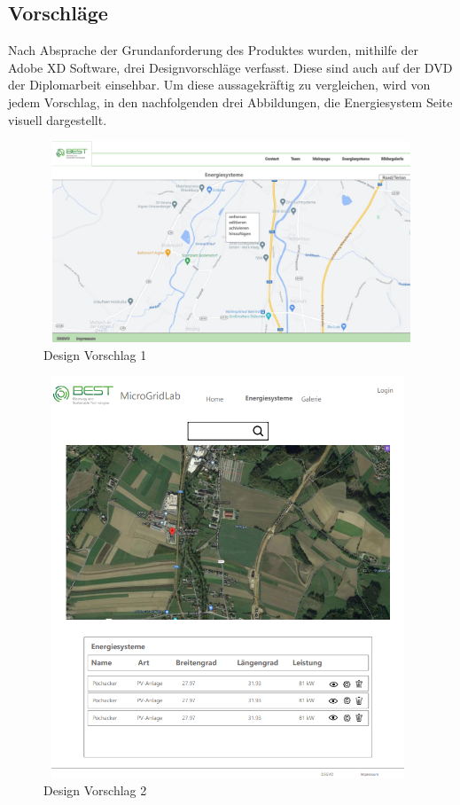 \subsection{Vorschläge}
Nach Absprache der Grundanforderung des Produktes wurden, mithilfe der Adobe XD Software,  drei Designvorschläge verfasst. Diese sind auch auf der DVD der Diplomarbeit einsehbar. Um diese aussagekräftig zu vergleichen, wird von jedem Vorschlag, in den nachfolgenden drei Abbildungen, die Energiesystem Seite visuell dargestellt.
\begin{figure}[h]
	\centering
	\includegraphics[height=6cm,width=12cm]{images/DesignVorschlag1}
	\caption{Design Vorschlag 1}
	\label{fig:Design Vorschlag 1}
\end{figure}
\newpage
\begin{figure}[h]
	\centering
	\includegraphics[height=12cm,width=11cm]{images/DesignVorschlag2}
	\caption{Design Vorschlag 2}
	\label{fig:Design Vorschlag 2}
\end{figure}
